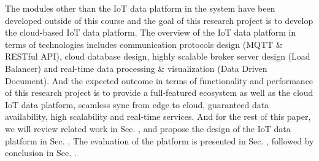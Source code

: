 \documentclass[conference]{IEEEtran}
\begin{document}


The modules other than the IoT data platform in the system have been developed outside of this course and the goal of this research project is to develop the cloud-based IoT data platform. The overview of the IoT data platform in terms of technologies includes communication protocols design (MQTT \& RESTful API), cloud database design, highly scalable broker server design (Load Balancer) and real-time data processing \& visualization (Data Driven Document). And the expected outcome in terms of functionality and performance of this research project is to provide a full-featured ecosystem as well as the cloud IoT data platform, seamless sync from edge to cloud, guaranteed data availability, high scalability and real-time services. And for the rest of this paper, we will review related work in Sec. \uppercase\expandafter{}, and propose the design of the IoT data platform in Sec. \uppercase\expandafter{}.  The evaluation of the platform is presented in Sec. \uppercase\expandafter{}, followed by conclusion in Sec. \uppercase\expandafter{}.

\end{document}
